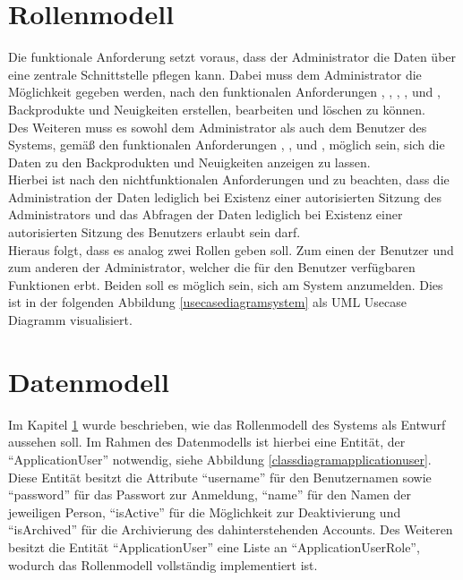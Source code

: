 \section{Rollenmodell} \label{rollenmodell}
Die funktionale Anforderung  setzt voraus, dass der Administrator die Daten über eine zentrale Schnittstelle pflegen kann. Dabei muss dem Administrator die Möglichkeit gegeben werden, nach den funktionalen Anforderungen , , , ,  und , Backprodukte und Neuigkeiten erstellen, bearbeiten und löschen zu können.
\\
Des Weiteren muss es sowohl dem Administrator als auch dem Benutzer des Systems, gemäß den funktionalen Anforderungen , ,  und , möglich sein, sich die Daten zu den Backprodukten und Neuigkeiten anzeigen zu lassen. 
\\
Hierbei ist nach den nichtfunktionalen Anforderungen  und  zu beachten, dass die Administration der Daten lediglich bei Existenz einer autorisierten Sitzung des Administrators und das Abfragen der Daten lediglich bei Existenz einer autorisierten Sitzung des Benutzers erlaubt sein darf.
\\
Hieraus folgt, dass es analog zwei Rollen geben soll. Zum einen der Benutzer und zum anderen der Administrator, welcher die für den Benutzer verfügbaren Funktionen erbt. Beiden soll es möglich sein, sich am System anzumelden.
Dies ist in der folgenden Abbildung \ref{usecasediagramsystem} als UML Usecase Diagramm visualisiert.


\clearpage

\section{Datenmodell} \label{datenmodell}
Im Kapitel \ref{rollenmodell} wurde beschrieben, wie das Rollenmodell des Systems als Entwurf aussehen soll.
Im Rahmen des Datenmodells ist hierbei eine Entität, der \enquote{ApplicationUser} notwendig, siehe Abbildung \ref{classdiagramapplicationuser}. Diese Entität besitzt die Attribute \enquote{username} für den Benutzernamen sowie \enquote{password} für das Passwort zur Anmeldung, \enquote{name} für den Namen der jeweiligen Person, \enquote{isActive} für die Möglichkeit zur Deaktivierung und \enquote{isArchived} für die Archivierung des dahinterstehenden Accounts. Des Weiteren besitzt die Entität \mbox{\enquote{ApplicationUser}} eine Liste an \enquote{ApplicationUserRole}, wodurch das Rollenmodell vollständig implementiert ist.

